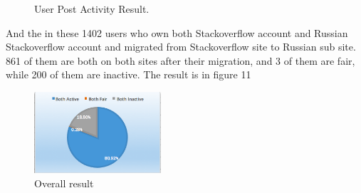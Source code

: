 \documentclass[A4paper,twoside,twocolumn]{article}
\begin{document}
	\begin{figure} [H]
	\centering 
	\caption{ User Post Activity Result. } 
	\label{fig} 
	\end{figure}
And the in these 1402 users who own both Stackoverflow account and Russian Stackoverflow account and migrated from Stackoverflow site to Russian sub site. 861 of them are both on both sites after their migration, and 3 of them are fair, while 200 of them are inactive. The result is in figure 11
	\begin{figure}[H]
		\includegraphics[width = 0.42\textwidth]{useractivity_post2.png}
		\caption{Overall result}
  	\end{figure}
\end{document}
